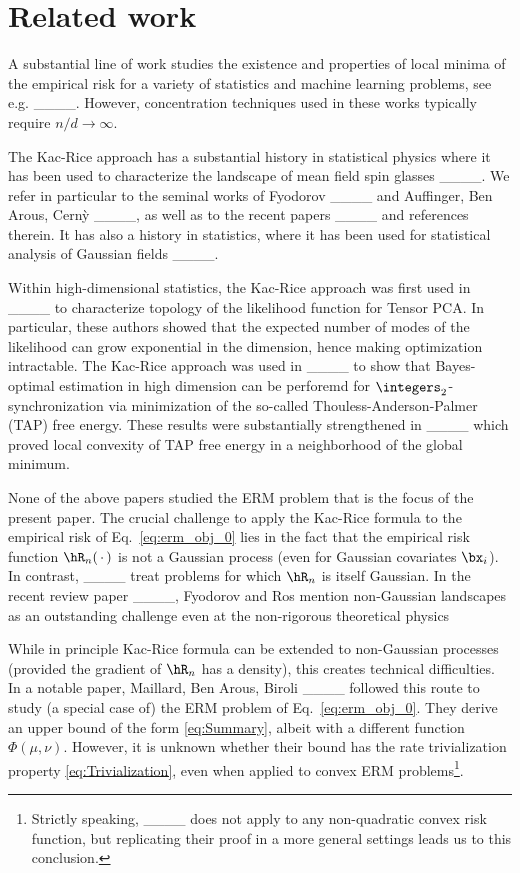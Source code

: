 \section{Related work}
A substantial line of work studies the existence and properties
of local minima of the empirical risk for a variety of statistics 
and machine learning problems, see e.g. 
____. However,
concentration techniques used in these works typically require $n/d\to\infty$.

The Kac-Rice approach has a substantial history in statistical
physics where it has been used to characterize the landscape of 
mean field spin glasses 
____. 
We refer in particular to the seminal works
of Fyodorov ____ and Auffinger, Ben Arous, Cern\`y ____, as well as to the recent papers
____ and references therein.
It has also a history in statistics, where it has been used for statistical analysis of Gaussian fields ____.

Within high-dimensional statistics, the Kac-Rice approach was first used
in ____ to characterize 
topology of the likelihood function for Tensor PCA. 
In particular, these authors showed that the expected number of modes of the likelihood can grow exponential in the dimension, hence 
making optimization intractable.
The Kac-Rice approach was used in ____ to show that Bayes-optimal estimation 
in high dimension can be perforemd for $\integers_{2}$-synchronization via minimization of the so-called Thouless-Anderson-Palmer (TAP) free energy. These results  were substantially strengthened in ____ which proved local convexity of TAP free energy in a neighborhood of
the global minimum. 

None of the above papers studied the ERM problem that is the focus of the present paper.
The crucial challenge to apply the Kac-Rice formula to
the empirical risk of Eq.~\eqref{eq:erm_obj_0} lies in the fact that
the empirical risk function $\hR_n(\,\cdot\,)$ is not a Gaussian process
(even for Gaussian covariates $\bx_i$).
In contrast, 
____
treat problems  for which $\hR_n$ is itself Gaussian.
In the recent review paper ____, Fyodorov and Ros 
mention non-Gaussian landscapes as an outstanding challenge even at the non-rigorous theoretical physics

While in principle Kac-Rice formula can be extended to non-Gaussian processes
(provided the gradient of $\hR_n$ has a density), this creates technical difficulties.  
In a notable paper, Maillard, Ben Arous, Biroli ____ 
followed this route to study (a special case of) the ERM problem
of Eq.~\eqref{eq:erm_obj_0}. They derive an upper bound
of the form \eqref{eq:Summary}, albeit with a different function 
$\Phi(\mu,\nu)$. However, it is unknown whether their bound has
the rate trivialization property \eqref{eq:Trivialization},
even when applied to convex ERM problems\footnote{Strictly speaking, ____ does not apply to any non-quadratic convex risk function, but replicating their proof in a more general settings leads us to this conclusion.}.

